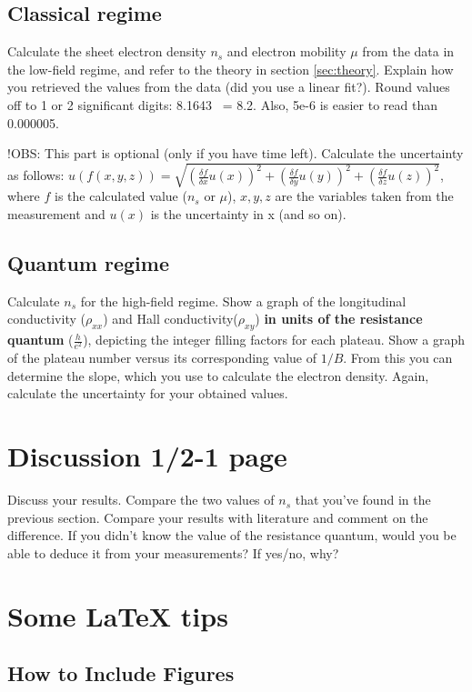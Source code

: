 \documentclass[a4paper]{article}
\begin{document}
\subsection{Classical regime}
Calculate the sheet electron density $n_{s}$ and electron mobility $\mu$ from the data in the low-field regime, and refer to the theory in section \ref{sec:theory}. Explain how you retrieved the values from the data (did you use a linear fit?).
Round values off to 1 or 2 significant digits: 8.1643 ~= 8.2. Also, 5e-6 is easier to read than 0.000005.

!OBS: This part is optional (only if you have time left).
Calculate the uncertainty as follows: \newline $u(f(x, y, z)) = \sqrt{(\frac{\delta f}{\delta{x}} u(x))^{2} + (\frac{\delta f}{\delta{y}} u(y))^{2} + (\frac{\delta f}{\delta{z}} u(z))^{2}}$, where $f$ is the calculated value ($n_{s}$ or $\mu$), $x, y, z$ are the variables taken from the measurement and $u(x)$ is the uncertainty in x (and so on).

\subsection{Quantum regime}
Calculate $n_{s}$ for the high-field regime.
Show a graph of the longitudinal conductivity ($\rho_{xx}$) and Hall conductivity($\rho_{xy}$) \textbf{in units of the resistance quantum} ($\frac{h}{e^{2}}$), depicting the integer filling factors for each plateau.
Show a graph of the plateau number versus its corresponding value of $1/B$. From this you can determine the slope, which you use to calculate the electron density.
Again, calculate the uncertainty for your obtained values.

\section{Discussion 1/2-1 page}
Discuss your results. Compare the two values of $n_{s}$ that you've found in the previous section. Compare your results with literature and comment on the difference. If you didn't know the value of the resistance quantum, would you be able to deduce it from your measurements? If yes/no, why?

\newpage
\section{Some LaTeX tips}
\label{sec:latex}
\subsection{How to Include Figures}
\end{document}
